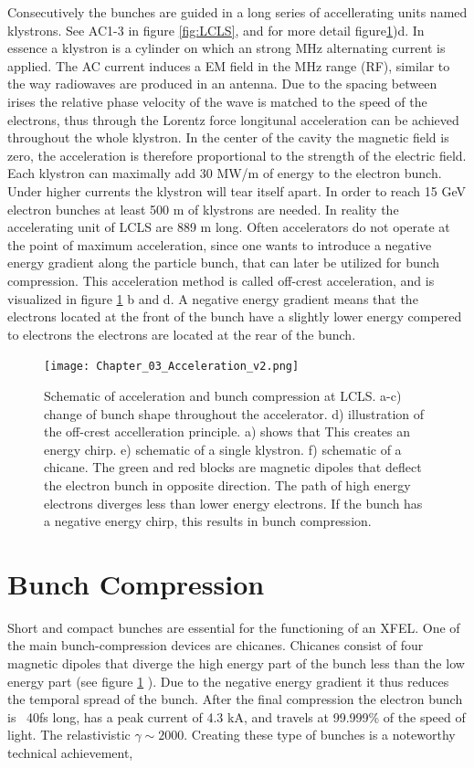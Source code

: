 Consecutively the bunches are guided in a long series of accellerating units named klystrons. See AC1-3 in figure \ref{fig:LCLS}, and for more detail figure\ref{fig:AC})d. In essence a klystron is a cylinder on which an strong MHz alternating current is applied. The AC current induces a EM field in the MHz range (RF), similar to the way radiowaves are produced in an antenna. Due to the spacing between irises the relative phase velocity of the wave is matched to the speed of the electrons, thus through the Lorentz force longitunal acceleration can be achieved throughout the whole klystron. In the center of the cavity the magnetic field is zero, the acceleration is therefore proportional to the strength of the electric field. Each klystron can maximally add 30 MW/m of energy to the electron bunch. Under higher currents the klystron will tear itself apart. In order to reach 15 GeV electron bunches at least 500 m of klystrons are needed. In reality the accelerating unit of LCLS are 889 m long. Often accelerators do not operate at the point of maximum acceleration, since one wants to introduce a negative energy gradient along the particle bunch, that can later be utilized for bunch compression. This acceleration method is called off-crest acceleration, and is visualized in figure  \ref{fig:AC} b and d. A negative energy gradient means that the electrons located at the front of the bunch have a slightly lower energy compered to electrons the electrons are located at the rear of the bunch.

\begin{figure}[h]\label{fig:AC}
\centering
\texttt{[image: Chapter\_03\_Acceleration\_v2.png]}
\caption{Schematic of acceleration and bunch compression at LCLS. a-c) change of bunch shape throughout the accelerator. d) illustration of the off-crest accelleration principle. a) shows that  This creates an energy chirp. e) schematic of a single klystron. f) schematic of a chicane. The green and red blocks are magnetic dipoles that deflect the electron bunch in opposite direction. The path of high energy electrons diverges less than lower energy electrons. If the bunch has a negative energy chirp, this results in bunch compression.}
\end{figure}

\section{Bunch Compression}
Short and compact bunches are essential for the functioning of an XFEL. One of the main bunch-compression devices are chicanes. Chicanes consist of four magnetic dipoles that diverge the high energy part of the bunch less than the low energy part (see figure \ref{fig:AC} ). Due to the negative energy gradient it thus reduces the temporal spread of the bunch. After the final compression the electron bunch is ~40fs long, has a peak current of 4.3 kA, and travels at 99.999\% of the speed of light. The relastivistic $\gamma \sim 2000$. Creating these type of bunches is a noteworthy technical achievement, 

